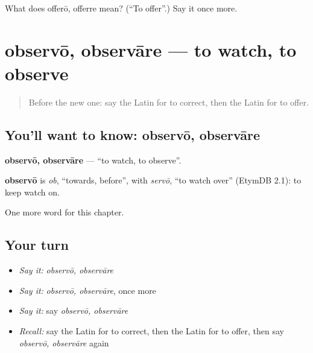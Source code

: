 \begin{tcolorbox}[breakable,colback=teal!4,colframe=teal!35!black,title={Before you move on}]
What does offerō, offerre mean? (\textquotedblleft{}To offer\textquotedblright{}.) Say it once more.
\end{tcolorbox}
\section[observō, observāre]{observō, observāre — to watch, to observe}

\label{lesson:LA-C257-observo}



\begin{quote}
Before the new one: say the Latin for to correct, then the Latin for to offer.
\end{quote}

\subsection*{You'll want to know: observō, observāre}
\textbf{observō, observāre} — \textquotedblleft{}to watch, to observe\textquotedblright{}.

\begin{cousinweb}
\textbf{observō} is \emph{ob}, \textquotedblleft{}towards, before\textquotedblright{}, with \emph{servō}, \textquotedblleft{}to watch over\textquotedblright{} (EtymDB 2.1): to keep watch on.
\end{cousinweb}

\begin{grammarlens}[title={What you've built}]
One more word for this chapter.
\end{grammarlens}

\subsection*{Your turn}
\begin{itemize}
\raggedright
  \item \emph{Say it:} \emph{observō, observāre}
  \item \emph{Say it:} \emph{observō, observāre}, once more
  \item \emph{Say it:} say \emph{observō, observāre}
  \item \emph{Recall:} say the Latin for to correct, then the Latin for to offer, then say \emph{observō, observāre} again
\end{itemize}

